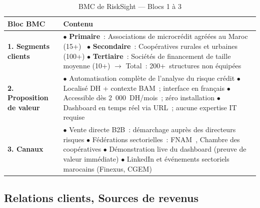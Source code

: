 \documentclass[12pt, a4paper]{report}
\begin{document}
\begin{table}[H]
\centering
\caption{BMC de RiskSight --- Blocs 1 à 3}
\label{tab:bmc_123}
\renewcommand{\arraystretch}{1.8}
\begin{tabularx}{\textwidth}{p{3.5cm} X}
\toprule
\rowcolor{primary!12}
Bloc BMC & Contenu \\
\midrule
\textbf{1. Segments clients} &
  $\bullet$ \textbf{Primaire}~: Associations de microcrédit agréées au Maroc (15+)~\cite{fnam} \newline
  $\bullet$ \textbf{Secondaire}~: Coopératives rurales et urbaines (100+) \newline
  $\bullet$ \textbf{Tertiaire}~: Sociétés de financement de taille moyenne (10+) \newline
  $\rightarrow$ Total~: 200+~structures non équipées~\cite{fnam,bam_rapport} \\
\midrule
\textbf{2. Proposition de valeur} &
  $\bullet$ Automatisation complète de l'analyse du risque crédit \newline
  $\bullet$ Localisé DH + contexte BAM~; interface en français \newline
  $\bullet$ Accessible dès 2~000~DH/mois~; zéro installation \newline
  $\bullet$ Dashboard en temps réel via URL~; aucune expertise IT requise \\
\midrule
\textbf{3. Canaux} &
  $\bullet$ Vente directe B2B~: démarchage auprès des directeurs risques \newline
  $\bullet$ Fédérations sectorielles~: FNAM~\cite{fnam}, Chambre des coopératives \newline
  $\bullet$ Démonstration live du dashboard (preuve de valeur immédiate) \newline
  $\bullet$ LinkedIn et événements sectoriels marocains (Finexus, CGEM) \\
\bottomrule
\end{tabularx}
\end{table}

\subsection{Relations clients, Sources de revenus}
\end{document}
